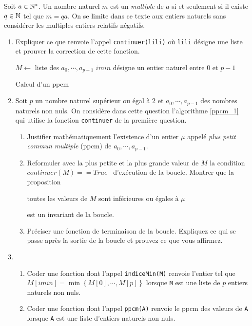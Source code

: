 Soit $a \in \mathbb{N}^*$. Un nombre naturel $m$ est un \emph{multiple} de $a$ si et seulement si il existe $q\in \mathbb{N}$ tel que $m=qa$. On se limite dans ce texte aux entiers naturels sans considérer les multiples entiers relatifs négatifs.

\begin{enumerate}
  \item Expliquer ce que renvoie l'appel \texttt{continuer(lili)} où \texttt{lili} désigne une liste et prouver la correction de cette fonction.


\begin{algorithm}
    $M \leftarrow$ liste des $a_0, \cdots , a_{p-1}$\;
    $imin$ désigne un entier naturel entre 0 et $p-1$\;
  \caption{Calcul d'un ppcm}
  \label{ppcm_1}
\end{algorithm}

  \item Soit $p$ un nombre naturel supérieur ou égal à $2$ et $a_0, \cdots , a_{p-1}$ des nombres naturels non nuls. On considère dans cette question l'algorithme \ref{ppcm_1} qui utilise la fonction \texttt{continuer} de la première question.
\begin{enumerate}
  \item Justifier mathématiquement l'existence d'un entier $\mu$ appelé \emph{plus petit commun multiple} (ppcm) de $a_0, \cdots , a_{p-1}$.
  
  \item Reformuler avec la plus petite et la plus grande valeur de $M$ la condition \og $continuer(M) == True$\fg~ d'exécution de la boucle. Montrer que la proposition 
   \begin{center}
     \og toutes les valeurs de $M$ sont inférieures ou égales à $\mu$\fg
   \end{center}
  est un invariant de la boucle.
  
  \item Préciser une fonction de terminaison de la boucle. Expliquez ce qui se passe après la sortie de la boucle et prouvez ce que vous affirmez.
\end{enumerate}

  \item 
\begin{enumerate}
  \item Coder une fonction dont l'appel \texttt{indiceMin(M)} renvoie l'entier tel que $M[imin]=\min\left\lbrace M[0], \cdots, M[p]\right\rbrace$ lorsque \texttt{M} est une liste de $p$ entiers naturels non nuls.
  \item Coder une fonction dont l'appel \texttt{ppcm(A)} renvoie le ppcm des valeurs de \texttt{A} lorsque \texttt{A} est une liste d'entiers naturels non nuls. 
\end{enumerate}

\end{enumerate}
